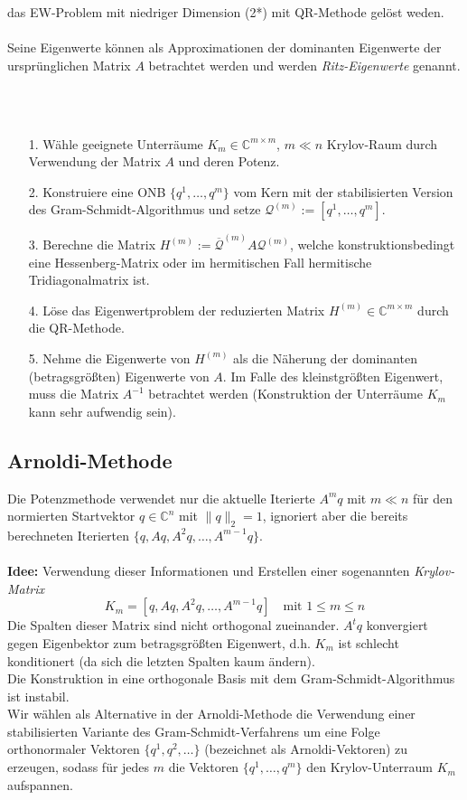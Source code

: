 das EW-Problem mit niedriger Dimension (2*) mit QR-Methode gelöst weden. \\ \\
Seine Eigenwerte können als Approximationen der dominanten Eigenwerte der ursprünglichen Matrix $A$ betrachtet werden
und werden \textit{Ritz-Eigenwerte} genannt. \\ \\
\begin{sumbox} \ 
    \begin{enumerate}
        \item[1.] Wähle geeignete Unterräume $K_m\in\mathbb{C}^{m\times m}$, $m\ll n$ Krylov-Raum durch Verwendung der 
        Matrix $A$ und deren Potenz.
        \item[2.] Konstruiere eine ONB $\{q^1,\dotsc, q^m\}$ vom Kern mit der stabilisierten Version des 
        Gram-Schmidt-Algorithmus und setze $\mathcal{Q}^{(m)}:=[q^1,\dotsc,q^m]$.
        \item[3.] Berechne die Matrix $H^{(m)}:=\overline{\mathcal{Q}}^{(m)}A\mathcal{Q}^{(m)}$, welche 
        konstruktionsbedingt eine Hessenberg-Matrix oder im hermitischen Fall hermitische Tridiagonalmatrix ist. 
        \item[4.] Löse das Eigenwertproblem der reduzierten Matrix $H^{(m)}\in\mathbb{C}^{m\times m}$ durch die 
        QR-Methode.
        \item[5.] Nehme die Eigenwerte von $H^{(m)}$ als die Näherung der dominanten (betragsgrößten) Eigenwerte 
        von $A$. Im Falle des kleinstgrößten Eigenwert, muss die Matrix $A^{-1}$ betrachtet werden (Konstruktion 
        der Unterräume $K_m$ kann sehr aufwendig sein).
    \end{enumerate}
\end{sumbox}
\subsection{Arnoldi-Methode}
Die Potenzmethode verwendet nur die aktuelle Iterierte $A^mq$ mit $m\ll n$ für den normierten Startvektor 
$q\in\mathbb{C}^n$ mit $\|q\|_2=1$, ignoriert aber die bereits berechneten Iterierten $\{q,Aq,A^2q,\dotsc,A^{m-1}q\}$. \\ \\
\textbf{Idee:} Verwendung dieser Informationen und Erstellen einer sogenannten \textit{Krylov-Matrix}
\[K_m = [q,Aq,A^2q,\dotsc,A^{m-1}q]\quad\text{mit }1\leq m\leq n\]
Die Spalten dieser Matrix sind nicht orthogonal zueinander. $A^tq$ konvergiert gegen Eigenbektor zum betragsgrößten
Eigenwert, d.h. $K_m$ ist schlecht konditionert (da sich die letzten Spalten kaum ändern). \\
Die Konstruktion in eine orthogonale Basis mit dem Gram-Schmidt-Algorithmus ist instabil. \\
Wir wählen als Alternative in der Arnoldi-Methode die Verwendung einer stabilisierten Variante des 
Gram-Schmidt-Verfahrens um eine Folge orthonormaler Vektoren $\{q^1,q^2,\dotsc\}$ (bezeichnet als 
Arnoldi-Vektoren) zu erzeugen, sodass für jedes $m$ die Vektoren $\{q^1,\dotsc,q^m\}$ den Krylov-Unterraum $K_m$ 
aufspannen.